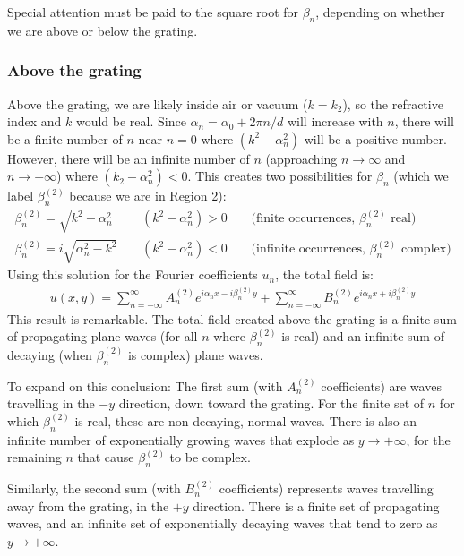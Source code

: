 Special attention must be paid to the square root for $\beta_n$, depending on whether we are above or below the grating.

\subsubsection{Above the grating}
  Above the grating, we are likely inside air or vacuum ($k=k_2$), so the refractive index and $k$ would be real.  Since $\alpha_n = \alpha_0 + 2\pi n/d$ will increase with $n$, there will be a finite number of $n$ near $n=0$ where $(k^2 - \alpha_n^2)$ will be a positive number.  However, there will be an infinite number of $n$ (approaching $n\rightarrow \infty$ and $n\rightarrow -\infty$) where $(k_2 - \alpha_n^2) < 0$.  This creates two possibilities for $\beta_n$ (which we label $\beta^{(2)}_n$ because we are in Region 2):
\begin{eqnarray}
\beta^{(2)}_n = \sqrt{k^2 - \alpha_n^2} \;\;\;\; & (k^2-\alpha_n^2)>0 \;\;\;\; &\textrm{(finite occurrences, } \beta^{(2)}_n\textrm{ real)} \\
\beta^{(2)}_n = i\sqrt{\alpha_n^2 - k^2} \;\;\;\; & (k^2-\alpha_n^2)<0 \;\;\;\; &\textrm{(infinite occurrences, } \beta^{(2)}_n\textrm{ complex)}
\end{eqnarray}
Using this solution for the Fourier coefficients $u_n$, the total field is:
\begin{eqnarray}
u(x,y) =  \sum_{n=-\infty}^{\infty} A^{(2)}_n e^{i \alpha_n x - i \beta^{(2)}_n y} +  \sum_{n=-\infty}^{\infty} B^{(2)}_n e^{i \alpha_n x + i \beta^{(2)}_n y}
\end{eqnarray}
This result is remarkable.  The total field created above the grating is a finite sum of propagating plane waves (for all $n$ where $\beta^{(2)}_n$ is real) and an infinite sum of decaying (when $\beta^{(2)}_n$ is complex) plane waves.

To expand on this conclusion: The first sum (with $A^{(2)}_n$ coefficients) are waves travelling in the $-y$ direction, down toward the grating.  For the finite set of $n$ for which $\beta^{(2)}_n$ is real, these are non-decaying, normal waves.  There is also  an infinite number of exponentially growing waves that explode as $y\rightarrow +\infty$, for the remaining $n$ that cause $\beta^{(2)}_n$ to be complex.

Similarly, the second sum (with $B^{(2)}_n$ coefficients) represents waves travelling away from the grating, in the $+y$ direction.  There is a finite set of propagating waves, and an infinite set of exponentially decaying waves that tend to zero as $y \rightarrow +\infty$.  

